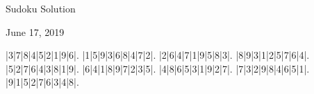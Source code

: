 \documentclass{article}
\begin{document}
\begin{center}
\Huge{Sudoku Solution}
\end{center}
\begin{center}
\Large{June 17, 2019}
\end{center}
\begin{sudoku}
|3|7|8|4|5|2|1|9|6|.
|1|5|9|3|6|8|4|7|2|.
|2|6|4|7|1|9|5|8|3|.
|8|9|3|1|2|5|7|6|4|.
|5|2|7|6|4|3|8|1|9|.
|6|4|1|8|9|7|2|3|5|.
|4|8|6|5|3|1|9|2|7|.
|7|3|2|9|8|4|6|5|1|.
|9|1|5|2|7|6|3|4|8|.
\end{sudoku}
\end{document}
